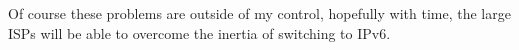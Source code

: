 \documentclass[12pt]{report}
\begin{document}
Of course these problems are outside of my control, hopefully with time, the
large ISPs will be able to overcome the inertia of switching to IPv6.
 
\pagebreak

\printnomenclature

\pagebreak

\cleardoublepage
{}
{}
{}



\end{document}
